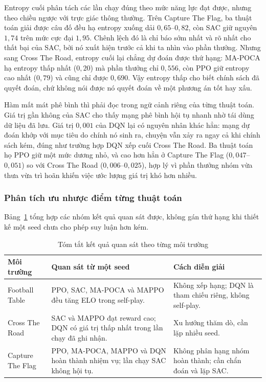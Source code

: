 \indent Entropy cuối phân tách các lần chạy đúng theo mức năng lực đạt được, nhưng theo
chiều ngược với trực giác thông thường. Trên Capture The Flag, ba thuật toán giải được câu
đố đều hạ entropy xuống dải $0{,}65$--$0{,}82$, còn SAC giữ nguyên $1{,}74$ trên mức cực
đại $1{,}95$. Chênh lệch đó là chỉ báo sớm nhất và rõ nhất cho thất bại của SAC, bởi nó xuất
hiện trước cả khi ta nhìn vào phần thưởng. Nhưng sang Cross The Road, entropy cuối lại
chẳng dự đoán được thứ hạng: MA-POCA hạ entropy thấp nhất ($0{,}20$) mà phần thưởng chỉ
$0{,}556$, còn PPO giữ entropy cao nhất ($0{,}79$) và cũng chỉ được $0{,}690$. Vậy entropy
thấp cho biết chính sách đã quyết đoán, chứ không nói được nó quyết đoán về một phương án
tốt hay xấu.

\indent Hàm mất mát phê bình thì phải đọc trong ngữ cảnh riêng của từng thuật toán. Giá
trị gần không của SAC cho thấy mạng phê bình hội tụ nhanh nhờ tái dùng dữ liệu đã lưu. Giá
trị $0{,}001$ của DQN lại có nguyên nhân khác hẳn: mạng dự đoán khớp với mục tiêu do chính nó
sinh ra, chuyện vẫn xảy ra ngay cả khi chính sách kém, đúng như trường hợp DQN xếp
cuối Cross The Road. Ba thuật toán họ PPO giữ một mức dương nhỏ, và cao hơn hẳn ở Capture
The Flag ($0{,}047$--$0{,}051$) so với Cross The Road ($0{,}006$--$0{,}025$), hợp lý vì phần
thưởng nhóm vừa thưa vừa trì hoãn khiến việc ước lượng giá trị khó hơn nhiều.

\subsubsection{Phân tích ưu nhược điểm từng thuật toán}
\indent Bảng~\ref{tab:overall_ranking} tổng hợp các nhóm kết quả quan sát được, không gán
thứ hạng khi thiết kế một seed chưa cho phép suy luận hơn kém.

\begin{table}[H]
\centering
\caption{Tóm tắt kết quả quan sát theo từng môi trường}
\label{tab:overall_ranking}
\renewcommand{\arraystretch}{1.35}
\tablefont
\begin{tabular}{|p{3.0cm}|p{5.0cm}|p{5.3cm}|}
\hline
\textbf{Môi trường} & \textbf{Quan sát từ một seed} & \textbf{Cách diễn giải} \\
\hline
Football Table & PPO, SAC, MA-POCA và MAPPO đều tăng ELO trong self-play. & Không xếp hạng; DQN là tham chiếu riêng, không self-play. \\
\hline
Cross The Road & SAC và MAPPO đạt reward cao; DQN có giá trị thấp nhất trong lần chạy đã ghi nhận. & Xu hướng thăm dò, cần lặp nhiều seed. \\
\hline
Capture The Flag & PPO, MA-POCA, MAPPO và DQN hoàn thành nhiệm vụ; lần chạy SAC không hội tụ. & Không phân hạng nhóm hoàn thành; cần chẩn đoán và lặp SAC. \\
\hline
\end{tabular}
\end{table}

